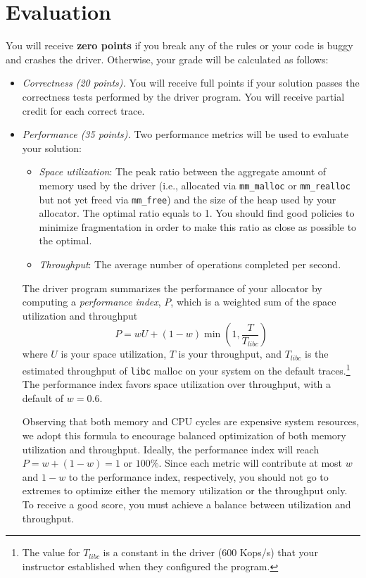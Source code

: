 \documentclass[11pt]{article}
\begin{document}
\section{Evaluation}

You will receive {\bf zero points} if you break any of the rules or
your code is buggy and crashes the driver.  Otherwise, your grade will
be calculated as follows:

\begin{itemize}

\item {\em Correctness (20 points).} You will receive full points if your
solution passes the correctness tests performed by the driver program.
You will receive partial credit for each correct trace.

\item {\em Performance (35 points).}  Two performance metrics will be used
to evaluate your solution:

\begin{itemize}
\item {\it Space utilization}: The peak ratio between the aggregate
amount of memory used by the driver (i.e., allocated via
{\tt mm\_malloc} or {\tt mm\_realloc} but not yet freed via
{\tt mm\_free}) and the size of the heap used by your allocator. The
optimal ratio equals to 1.  You should find good policies to minimize
fragmentation in order to make this ratio as close as possible to the
optimal.

\item
{\it Throughput}: The average number of operations completed per second.
\end{itemize}

The driver program summarizes the performance of your
allocator by computing a {\em performance index}, $P$, which is a
weighted sum of the space utilization and throughput
\begin{displaymath}
P = w{U} + (1-w) \min\left(1, \frac{T}{T_{libc}}\right) 
\end{displaymath}
where $U$ is your space utilization, $T$ is your throughput, and
$T_{libc}$ is the estimated throughput of {\tt libc} malloc on your
system on the default traces.\footnote{The value for $T_{libc}$ is a
constant in the driver (600 Kops/s) that your instructor established
when they configured the program.}
The performance index favors space utilization over throughput, with a
default of $w = 0.6$.

Observing that both memory and CPU cycles are expensive system
resources, we adopt this formula to encourage balanced optimization of
both memory utilization and throughput.  Ideally, the performance
index will reach \( P = w + (1-w) = 1\) or \( 100\% \).  Since each
metric will contribute at most $w$ and $1-w$ to the performance index,
respectively, you should not go to extremes to optimize either the
memory utilization or the throughput only. To receive a good score,
you must achieve a balance between utilization and throughput.


\end{itemize}
\end{document}
